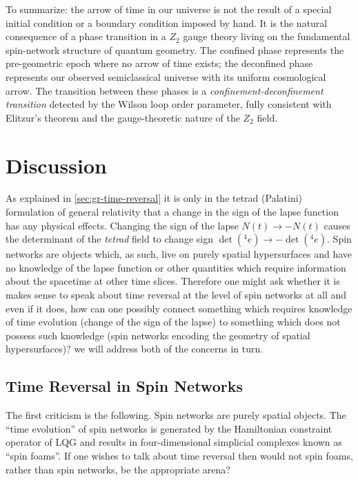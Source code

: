 \documentclass[preprint]{SciPost}
\theoremstyle{plain} %
\begin{document}
To summarize: the arrow of time in our universe is not the result of a special initial condition or a boundary condition imposed by hand. It is the natural consequence of a phase transition in a $ Z_2 $ gauge theory living on the fundamental spin-network structure of quantum geometry. The confined phase represents the pre-geometric epoch where no arrow of time exists; the deconfined phase represents our observed semiclassical universe with its uniform cosmological arrow. The transition between these phases is a \emph{confinement-deconfinement transition} detected by the Wilson loop order parameter, fully consistent with Elitzur's theorem and the gauge-theoretic nature of the $ Z_2 $ field.

\section{Discussion}\label{sec:discussion}

As explained in \autoref{sec:gr-time-reversal} it is only in the tetrad (Palatini) formulation of general relativity that a change in the sign of the lapse function has any physical effects. Changing the sign of the lapse $ N(t) \rightarrow -N(t) $ causes the determinant of the \emph{tetrad} field to change sign $ \det ({}^4 e) \rightarrow - \det ({}^4 e) $. Spin networks are objects which, as such, live on purely spatial hypersurfaces and have no knowledge of the lapse function or other quantities which require information about the spacetime at other time slices. Therefore one might ask whether it is makes sense to speak about time reversal at the level of spin networks at all and even if it does, how can one possibly connect something which requires knowledge of time evolution (change of the sign of the lapse) to something which does not possess such knowledge (spin networks encoding the geometry of spatial hypersurfaces)? we will address both of the concerns in turn.

\subsection{Time Reversal in Spin Networks}

The first criticism is the following. Spin networks are purely spatial objects. The ``time evolution'' of spin networks is generated by the Hamiltonian constraint operator of LQG and results in four-dimensional simplicial complexes known as ``spin foams''. If one wishes to talk about time reversal then would not spin foams, rather than spin networks, be the appropriate arena?
\end{document}
